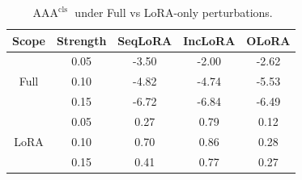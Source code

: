 \documentclass{article}
\theoremstyle{plain}
\theoremstyle{definition}
\theoremstyle{remark}
\begin{document}
{%
\setlength{\textfloatsep}{0pt}      %
\setlength{\intextsep}{2pt}         %
\setlength{\floatsep}{1pt}          %
\setlength{\abovecaptionskip}{2pt}  %
\setlength{\belowcaptionskip}{4pt}  %
\begin{table}[t]
\centering
\caption{$\operatorname{AAA}^{\mathrm{cls}}$ under Full vs LoRA-only perturbations.}
\label{tab:lora_or_full_cls—show}
\footnotesize
\setlength{\tabcolsep}{3pt}
\renewcommand{\arraystretch}{0.88}
\begin{tabular}{@{}c c c c c@{}}
\toprule
\textbf{Scope} & \textbf{Strength} & \textbf{SeqLoRA} & \textbf{IncLoRA} & \textbf{OLoRA} \\
\midrule
\multirow{3}{*}{Full}
 & 0.05 & -3.50 & -2.00 & -2.62 \\
 & 0.10 & -4.82 & -4.74 & -5.53 \\
 & 0.15 & -6.72 & -6.84 & -6.49 \\
\midrule
\multirow{3}{*}{LoRA}
 & 0.05 & 0.27 & 0.79 & 0.12 \\
 & 0.10 & 0.70 & 0.86 & 0.28 \\
 & 0.15 & 0.41 & 0.77 & 0.27 \\
\bottomrule
\end{tabular}
\end{table}
}%
\end{document}
